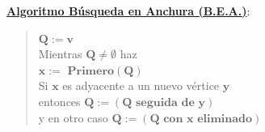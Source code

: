 \documentclass[twoside]{report}
\newcommand{\bs}[1]{\boldsymbol{#1}}
\begin{document}
\vspace{1cm}
\noindent\underline{\textbf{Algoritmo Búsqueda en Anchura (B.E.A.)}}:

        \begin{quotation}
        \noindent $\bs{Q:=v}$\\[1ex]
        \textsf{Mientras} $\bs{Q\neq\emptyset}$ \textsf{haz}\\[1ex]
        \hspace*{5ex} $\bs{x:=\mbox{ Primero}(Q)}$\\[1ex]
        \hspace*{5ex} \textsf{Si} $\bs{x}$ es adyacente a un nuevo vértice $\bs{y}$\\[1ex]
        \hspace*{10ex} \textsf{entonces} $\bs{Q:=(Q\mbox{ seguida de }y)}$\\[1ex]
        \hspace*{10ex} \textsf{y en otro caso} $\bs{Q:=(Q\mbox{ con }x\mbox{ eliminado})}$
        \end{quotation}
\end{document}

